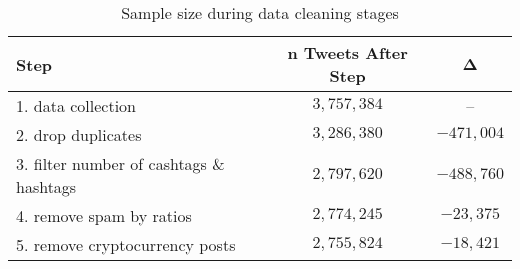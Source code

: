 \begin{table}[!ht]
	\centering
	\begin{tabular}{lcc}
		\toprule
		\textbf{Step} & \textbf{$\bm{n}$ Tweets After Step} & $\bm{\Delta}$ \\
		\midrule
		1. data collection & $3,757,384$ & -- \\
		2. drop duplicates & $3,286,380$ & $-471,004$ \\
		3. filter number of cashtags \& hashtags & $2,797,620$ & $-488,760$ \\
		4. remove spam by ratios & $2,774,245$ & $-23,375$ \\
		5. remove cryptocurrency posts & $2,755,824$ & $-18,421$\\
		\bottomrule
	\end{tabular}
	\caption{Sample size during data cleaning stages}
	\label{table-samplesize-datacleaning}
\end{table}